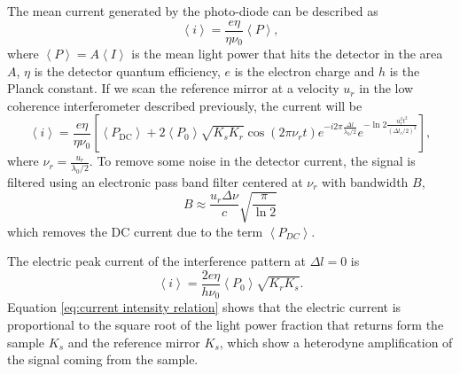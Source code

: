 \documentclass[12pt,twoside,english]{book}
\renewcommand{\~}{\perispomeni}%
\numberwithin{equation}{section}
\numberwithin{figure}{section}
\begin{document}
The mean current generated by the photo-diode can be described as
\begin{equation}
\left\langle i\right\rangle =\frac{e\eta}{\eta\nu_{0}}\left\langle P\right\rangle ,\end{equation}
where $\left\langle P\right\rangle =A\left\langle I\right\rangle $ is the mean light power that hits the detector in the area $A$, $\eta$ is the detector quantum efficiency, $e$ is the electron charge and $h$ is the Planck constant. If we scan the reference mirror at a velocity $u_{r}$ in the low coherence interferometer described previously, the current will be
\begin{equation}
\left\langle i\right\rangle =\frac{e\eta}{\eta\nu_{0}}\left[\left\langle P_{\text{DC}}\right\rangle +2\left\langle P_{0}\right\rangle \sqrt{K_{s}K_{r}}\cos\left(2\pi\nu_{r}t\right)e^{-i2\pi\frac{\Delta l}{\lambda_{0}/2}}e^{-\ln2\frac{u_{r}^{2}t^{2}}{\left(\Delta l_{c}/2\right)^{2}}}\right],\end{equation}
where $\nu_{r}=\frac{u_{r}}{\lambda_{0}/2}$. To remove some noise in the detector current, the signal is filtered using an electronic pass band filter centered at $\nu_{r}$ with bandwidth $B$,
\begin{equation}
B\approx\frac{u_{r}\Delta\nu}{c}\sqrt{\frac{\pi}{\ln2}}\end{equation}
which removes the DC current due to the term $\left\langle P_{DC}\right\rangle $. 

The electric peak current of the interference pattern at $\Delta l=0$ is
\begin{equation}
\left\langle i\right\rangle =\frac{2e\eta}{h\nu_{0}}\left\langle P_{0}\right\rangle \sqrt{K_{r}K_{s}}.\label{eq:current intensity relation}\end{equation}
Equation \ref{eq:current intensity relation} shows that the electric current is proportional to the square root of the light power fraction that returns form the sample $K_{s}$ and the reference mirror $K_{s}$, which show a heterodyne amplification of the signal coming from the sample.
\end{document}
